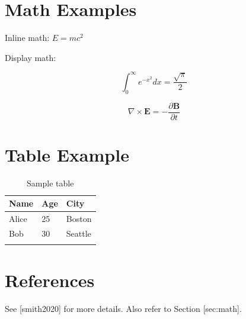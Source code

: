 \documentclass[11pt,a4paper]{article}
\begin{document}
\section{Math Examples}

Inline math:  $E = mc^2$

Display math:

$$\int_0^\infty e^{-x^2} dx = \frac{\sqrt{\pi}}{2}$$

$$\begin{equation}
\nabla \times \mathbf{E} = -\frac{\partial \mathbf{B}}{\partial t}
\end{equation}$$

\section{Table Example}

\begin{table}[h]
\caption{Sample table}
\begin{tabular}{|l|l|l|}
\hline
Name & Age & City \\ \hline
Alice & 25 & Boston \\ \hline
Bob & 30 & Seattle \\ \hline
 &  &  \\ \hline
\end{tabular}
\end{table}

\section{References}

See [smith2020] for more details. Also refer to Section [sec:math].
\end{document}
